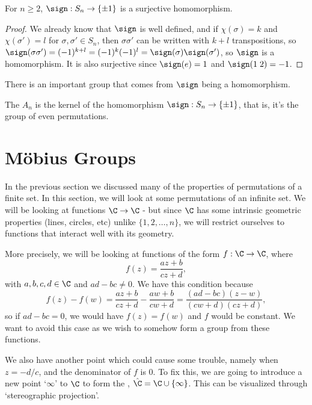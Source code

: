 \documentclass[a4]{scrreprt}
\newcommand{\newsection}{\section}
\begin{document}
\begin{proposition}
	For $n \geq 2$, $\sign : S_n \rightarrow \{\pm 1\}$ is a surjective homomorphism.
\end{proposition}
\begin{proof}
	We already know that $\sign$ is well defined, and if $\chi(\sigma) = k$ and $\chi(\sigma') = l$ for $\sigma, \sigma' \in S_n$, then $\sigma \sigma'$ can be written with $k + l$ transpositions, so $\sign(\sigma \sigma') = (-1)^{k + l} = (-1)^k (-1)^l = \sign(\sigma) \sign(\sigma')$, so $\sign$ is a homomorphism. It is also surjective since $\sign(e) = 1$ and $\sign(1\; 2) = -1$.
\end{proof}

There is an important group that comes from $\sign$ being a homomorphism.

\begin{definition}
	The  $A_n$ is the kernel of the homomorphism $\sign : S_n \rightarrow \{ \pm 1\}$, that is, it's the group of even permutations.
\end{definition}


\newsection{Möbius Groups}

In the previous section we discussed many of the properties of permutations of a finite set. In this section, we will look at some permutations of an infinite set. We will be looking at functions $\C \rightarrow \C$ - but since $\C$ has some intrinsic geometric properties (lines, circles, etc) unlike $\{1, 2, \dots, n\}$, we will restrict ourselves to functions that interact well with its geometry.

More precisely, we will be looking at functions of the form $f: \C \rightarrow \C$, where
$$
f(z) = \frac{az + b}{cz + d},
$$
with $a, b, c, d \in \C$ and $ad - bc \neq 0$. We have this condition because 
$$
f(z) - f(w) = \frac{az + b}{cz + d} - \frac{aw + b}{cw + d} = \frac{(ad - bc)(z - w)}{(cw + d)(cz + d)},
$$
so if $ad - bc = 0$, we would have $f(z) = f(w)$ and $f$ would be constant. We want to avoid this case as we wish to somehow form a group from these functions. 

We also have another point which could cause some trouble, namely when $z = -d/c$, and the denominator of $f$ is 0. To fix this, we are going to introduce a new point `$\infty$' to $\C$ to form the , $\hat{\C} = \C \cup \{ \infty \}$.  This can be visualized through `stereographic projection'.
\end{document}

